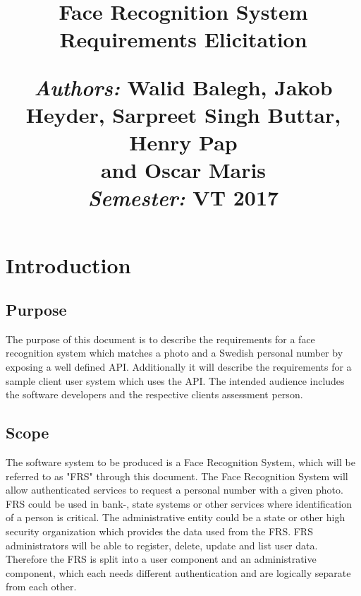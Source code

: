 \documentclass[a4paper,11pt]{article}
\title{
\vspace{-8cm}
\begin{flushleft}
    \vspace{10cm}
    \normalfont \normalsize
    \vspace{-1.3cm}
\end{flushleft}
\vspace{3cm}
\begin{flushleft}
    \huge Face Recognition System \\
    \LARGE  Requirements Elicitation\\
\end{flushleft}
\null
\vfill
\begin{minipage}{\textwidth}
\begin{flushleft} \large
\emph{Authors:} Walid Balegh, Jakob Heyder, Sarpreet Singh Buttar, Henry Pap\\ \hspace{45pt} and Oscar Maris \\ %
\emph{Semester:} VT 2017\\ %
\end{flushleft}
\end{minipage}
}
\date{}
\begin{document}
\maketitle

\newpage

\tableofcontents

\newpage





\newpage

\section{Introduction}

\subsection{Purpose}
The purpose of this document is to describe the requirements for a face recognition system which matches a photo and a Swedish personal number by exposing a well defined API. Additionally it will describe the requirements for a sample client user system which uses the API.
\newline
\noindent
The intended audience includes the software developers and the respective clients assessment person.

\subsection{Scope}

The software system to be produced is a Face Recognition System, which will be referred  to as "FRS" through this document.
\newline
\noindent
The Face Recognition System will allow authenticated services to request a personal number with a given photo.
FRS could be used in bank-, state systems or other services where identification of a person is critical.
The administrative entity could be a state or other high security organization which provides the data used from the FRS.
FRS administrators will be able to register, delete, update and list user data.
Therefore the FRS is split into a user component and an administrative component, which each needs different authentication and are logically separate from each other.
\end{document}
